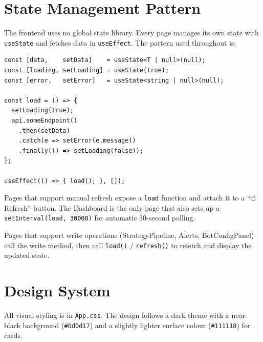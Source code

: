 \documentclass[12pt, a4paper]{article}
\begin{document}
\section{State Management Pattern}

The frontend uses no global state library. Every page manages its own state
with \texttt{useState} and fetches data in \texttt{useEffect}. The pattern
used throughout is:

\begin{Verbatim}[fontsize=\small]
const [data,    setData]    = useState<T | null>(null);
const [loading, setLoading] = useState(true);
const [error,   setError]   = useState<string | null>(null);

const load = () => {
  setLoading(true);
  api.someEndpoint()
    .then(setData)
    .catch(e => setError(e.message))
    .finally(() => setLoading(false));
};

useEffect(() => { load(); }, []);
\end{Verbatim}

Pages that support manual refresh expose a \texttt{load} function and attach it
to a ``$\circlearrowleft$ Refresh'' button. The Dashboard is the only page that
also sets up a \texttt{setInterval(load, 30000)} for automatic 30-second polling.

Pages that support write operations (StrategyPipeline, Alerts, BotConfigPanel)
call the write method, then call \texttt{load()} / \texttt{refresh()} to refetch
and display the updated state.


\section{Design System}

All visual styling is in \texttt{App.css}. The design follows a dark theme
with a near-black background (\texttt{\#0d0d17}) and a slightly lighter surface
colour (\texttt{\#111118}) for cards.
\end{document}
